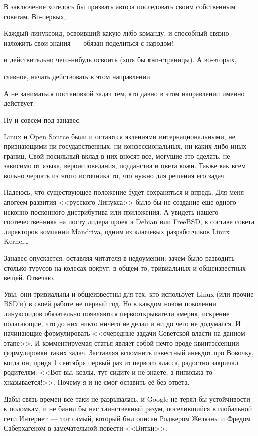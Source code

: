 В заключение хотелось бы призвать автора последовать своим собственным советам. Во-первых, 

Каждый линуксоид, освоивший какую-либо команду, и способный связно изложить свои знания~--- обязан поделиться с народом!

и действительно чего-нибудь освоить (хотя бы \texttt{man}-страницы). А во-вторых, 
\begin{shadequote}{}
главное, начать действовать в этом направлении.
\end{shadequote}

А не заниматься постановкой задач тем, кто давно в этом направлении именно действует. 

Ну и совсем под занавес. 

Linux и Open Source были и остаются явлениями интернациональными, не признающими ни государственных, ни конфессиональных, ни каких-либо иных границ. Свой посильный вклад в них вносят все, могущие это сделать, не зависимо от языка, вероисповедания, подданства и цвета кожи. Также как всем вольно черпать из этого источника то, что нужно для решения его задач. 

Надеюсь, что существующее положение будет сохраняться и впредь. Для меня апогеем развития <<русского Линукса>> было бы не создание еще одного исконно-посконного дистрибутива или приложения. А увидеть нашего соотечественника на посту лидера проекта Debian или FreeBSD, в составе совета директоров компании Mandriva, одним из ключевых разработчиков Linux Kernel\dots 

Занавес опускается, оставляя читателя в недоумении: зачем было разводить столько турусов на колесах вокруг, в общем-то, тривиальных и общеизвестных вещей. Отвечаю.

Увы, они тривиальны и общеизвестны для тех, кто использует Linux (или прочие BSD'и) в своей работе не первый год. Но в каждом новом поколении линуксоидов обязательно появляются первооткрыватели америк, искренне полагающие, что до них никто ничего не делал и ни до чего не додумался. И начинающие формулировать <<очередные задачи Советской власти на данном этапе>>. И комментируемая статья являет собой нечто вроде квинтэссенции формулировки таких задач. Заставляя вспомнить известный анекдот про Вовочку, когда он, придя 1 сентября первый раз из первого класса, радостно закричал родителям: <<Вот вы, козлы, тут сидите и не знаете, а пиписька-то х называется!>>. Почему я и не смог оставить её без ответа. 

Дабы связь времен все-таки не разрывалась, и Google не терял бы устойчивости к поломкам, и не банил бы нас таинственный разум, поселившийся в глобальной сети Интернет~--- тот самый, который был описан Роджером Желязны и Фредом Саберхагеном в замечательной повести <<Витки>>.

